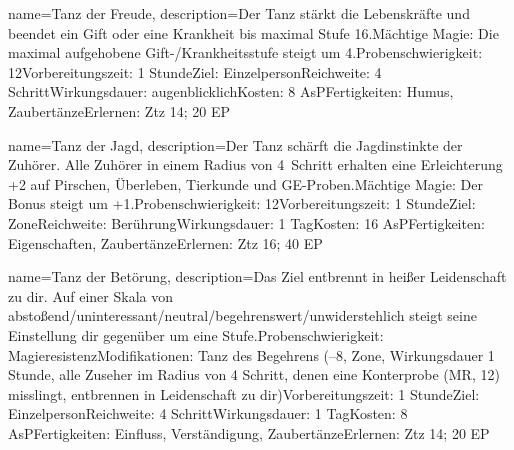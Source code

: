 {
    name={Tanz der Freude},
    description={Der Tanz stärkt die Lebenskräfte und beendet ein Gift oder eine Krankheit bis maximal Stufe 16.\newline Mächtige Magie: Die maximal aufgehobene Gift-/Krankheitsstufe steigt um 4.\newline Probenschwierigkeit: 12\newline Vorbereitungszeit: 1 Stunde\newline Ziel: Einzelperson\newline Reichweite: 4 Schritt\newline Wirkungsdauer: augenblicklich\newline Kosten: 8 AsP\newline Fertigkeiten: Humus, Zaubertänze\newline Erlernen: Ztz 14; 20 EP}
}


{
    name={Tanz der Jagd},
    description={Der Tanz schärft die Jagdinstinkte der Zuhörer. Alle Zuhörer in einem Radius von 4 Schritt erhalten eine Erleichterung +2 auf Pirschen, Überleben, Tierkunde und GE-Proben.\newline Mächtige Magie: Der Bonus steigt um +1.\newline Probenschwierigkeit: 12\newline Vorbereitungszeit: 1 Stunde\newline Ziel: Zone\newline Reichweite: Berührung\newline Wirkungsdauer: 1 Tag\newline Kosten: 16 AsP\newline Fertigkeiten: Eigenschaften, Zaubertänze\newline Erlernen: Ztz 16; 40 EP}
}


{
    name={Tanz der Betörung},
    description={Das Ziel entbrennt in heißer Leidenschaft zu dir. Auf einer Skala von abstoßend/uninteressant/neutral/begehrenswert/unwiderstehlich steigt seine Einstellung dir gegenüber um eine Stufe.\newline Probenschwierigkeit: Magieresistenz\newline Modifikationen: Tanz des Begehrens (–8, Zone, Wirkungsdauer 1 Stunde, alle Zuseher im Radius von 4 Schritt, denen eine Konterprobe (MR, 12) misslingt, entbrennen in Leidenschaft zu dir)\newline Vorbereitungszeit: 1 Stunde\newline Ziel: Einzelperson\newline Reichweite: 4 Schritt\newline Wirkungsdauer: 1 Tag\newline Kosten: 8 AsP\newline Fertigkeiten: Einfluss, Verständigung, Zaubertänze\newline Erlernen: Ztz 14; 20 EP}
}



